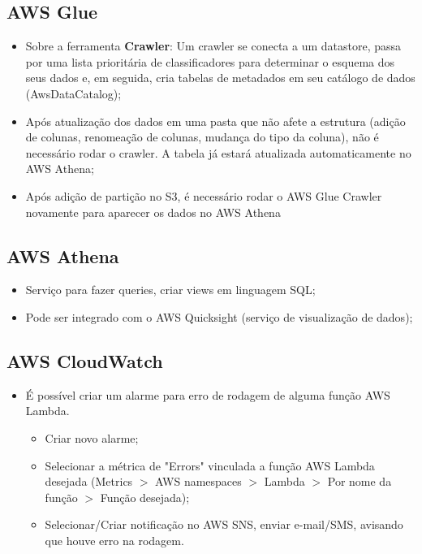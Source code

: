 \subsection{AWS Glue}
    \begin{itemize}
        
        \item Sobre a ferramenta \textbf{Crawler}: Um crawler se conecta a um datastore, passa por uma lista prioritária de classificadores para determinar o esquema dos seus dados e, em seguida, cria tabelas de metadados em seu catálogo de dados (AwsDataCatalog);
        
        \item Após atualização dos dados em uma pasta que não afete a estrutura (adição de colunas, renomeação de colunas, mudança do tipo da coluna), não é necessário rodar o crawler. A tabela já estará atualizada automaticamente no AWS Athena;
        
        \item Após adição de partição no S3, é necessário rodar o AWS Glue Crawler novamente para aparecer os dados no AWS Athena
    
    \end{itemize}    

\subsection{AWS Athena}
\begin{itemize}
    \item Serviço para fazer queries, criar views em linguagem SQL;
    \item Pode ser integrado com o AWS Quicksight (serviço de visualização de dados);
\end{itemize}

\subsection{AWS CloudWatch}
\begin{itemize}
    \item É possível criar um alarme para erro de rodagem de alguma função AWS Lambda.
    \begin{itemize}
        \item Criar novo alarme;
        \item Selecionar a métrica de "Errors" vinculada a função AWS Lambda desejada (Metrics $>$ AWS namespaces $>$ Lambda $>$ Por nome da função $>$ Função desejada);
        \item Selecionar/Criar notificação no AWS SNS, enviar e-mail/SMS, avisando que houve erro na rodagem.
    \end{itemize}
\end{itemize}

